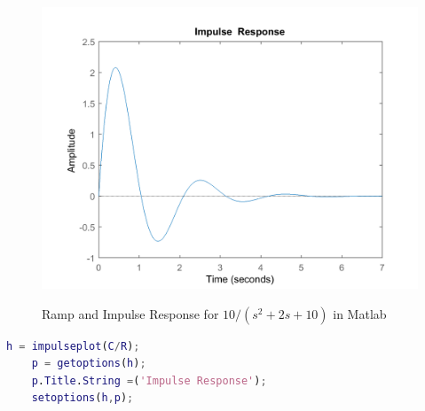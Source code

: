 \documentclass[12pt]{article}
\newenvironment{problem}[2][Problem]{\begin{trivlist}
		\item[\hskip \labelsep {\bfseries #1}\hskip \labelsep {\bfseries #2.}]}{\end{trivlist}}
\begin{document}
\begin{problem}{7 --- B-5-10 --- Matlab plotting}
\begin{figure}[H]
\begin{minipage}{.5\textwidth}
	\label{fig:q7ramp}
	\end{minipage}%
	\begin{minipage}{0.5\textwidth}
		\centering
	\includegraphics[width=1\linewidth]{Images/Q7Impulse}
	\label{fig:q7impulse}
	\end{minipage}
\caption{Ramp and Impulse Response for $10 / (s^2+2s+10)$ in Matlab}
\label{fig:q7rampImpulse}
\end{figure}

\begin{lstlisting}[language = Matlab]
	h = impulseplot(C/R);
	p = getoptions(h);
	p.Title.String =('Impulse Response');
	setoptions(h,p);
\end{lstlisting}

\end{problem}
\end{document}
